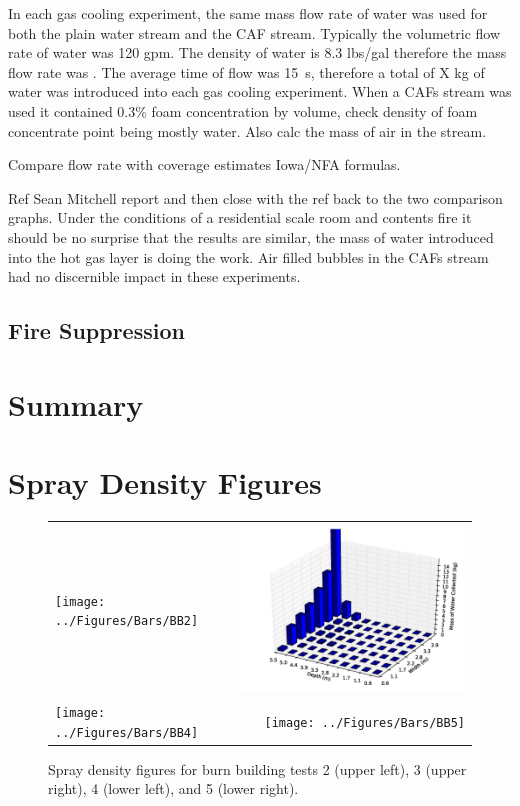\documentclass[12pt,oneside]{book}
\begin{document}
In each gas cooling experiment, the same mass flow rate of water was used for both the plain water stream and the CAF stream. Typically the volumetric flow rate of water was 120 gpm. The density of water is 8.3 lbs/gal    therefore the mass flow rate was    .  The average time of flow was 15~s, therefore a total of X kg of water was introduced into each gas cooling experiment. When a CAFs stream was used it contained 0.3\% foam concentration by volume, check density of foam concentrate   point being mostly water.  Also calc the mass of air in the stream.

Compare flow rate with coverage estimates Iowa/NFA formulas. 

Ref Sean Mitchell report and then close with the ref back to the two comparison graphs.   Under the conditions of a residential scale room and contents fire it should be no surprise that the results are similar, the mass of water introduced into the hot gas layer is doing the work.  Air filled bubbles in the CAFs stream had no discernible impact in these experiments.   

\section{Fire Suppression}
\label{sec:Fire_Suppression_discussion}


\chapter{Summary}
\label{chap:Summary}



\appendix

\chapter{Spray Density Figures}
\label{app:spray_density}

\begin{figure}[ht]
\begin{tabular*}{\textwidth}{lr}
\texttt{[image: ../Figures/Bars/BB2]} &
\includegraphics[width=3.2in]{../Figures/Bars/BB3} \\
\texttt{[image: ../Figures/Bars/BB4]} &
\texttt{[image: ../Figures/Bars/BB5]}
\end{tabular*}
\caption{Spray density figures for burn building tests 2 (upper left), 3 (upper right), 4 (lower left), and 5 (lower right).}
\label{fig:bb_2_5}
\end{figure}
\end{document}
